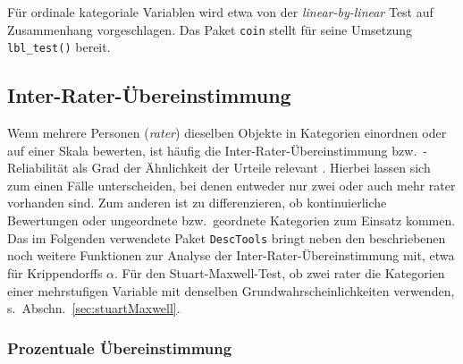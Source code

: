 Für ordinale kategoriale Variablen wird etwa von  der \emph{linear-by-linear} Test auf Zusammenhang vorgeschlagen. Das Paket \lstinline!coin! stellt für seine Umsetzung \lstinline!lbl_test()! bereit.

\subsection{Inter-Rater-Übereinstimmung}
\label{sec:irr}

Wenn mehrere Personen (\emph{rater}) dieselben Objekte in Kategorien einordnen oder auf einer Skala bewerten, ist häufig die Inter-Rater-Übereinstimmung bzw.\ -Reliabilität als Grad der Ähnlichkeit der Urteile relevant \cite{Wirtz2002}. Hierbei lassen sich zum einen Fälle unterscheiden, bei denen entweder nur zwei oder auch mehr rater vorhanden sind. Zum anderen ist zu differenzieren, ob kontinuierliche Bewertungen oder ungeordnete bzw.\ geordnete Kategorien zum Einsatz kommen. Das im Folgenden verwendete Paket \lstinline!DescTools! bringt neben den beschriebenen noch weitere Funktionen zur Analyse der Inter-Rater-Übereinstimmung mit, etwa für Krippendorffs $\alpha$. Für den Stuart-Maxwell-Test, ob zwei rater die Kategorien einer mehrstufigen Variable mit denselben Grundwahrscheinlichkeiten verwenden, s.\ Abschn.\ \ref{sec:stuartMaxwell}.

\subsubsection{Prozentuale Übereinstimmung}

